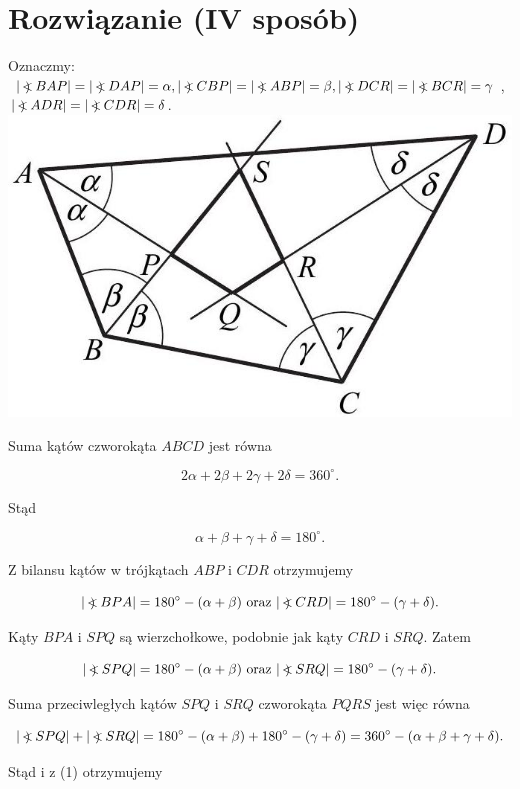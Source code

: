 \documentclass[10pt]{article}
\newcommand\Varangle{\mathop{{<\!\!\!\!\!\text{\small)}}\:}\nolimits}
\begin{document}
\section*{Rozwiązanie (IV sposób)}
Oznaczmy: $|\Varangle B A P|=|\Varangle D A P|=\alpha,|\Varangle C B P|=|\Varangle A B P|=\beta,|\Varangle D C R|=|\Varangle B C R|=\gamma$, $|\Varangle A D R|=|\Varangle C D R|=\delta$.\\
\includegraphics[max width=\textwidth, center]{2025_02_07_f5f4e8f37e6baab02e47g-10}

Suma kątów czworokąta $A B C D$ jest równa

$$
2 \alpha+2 \beta+2 \gamma+2 \delta=360^{\circ} .
$$

Stąd


\begin{equation*}
\alpha+\beta+\gamma+\delta=180^{\circ} . \tag{1}
\end{equation*}


Z bilansu kątów w trójkątach $A B P$ i $C D R$ otrzymujemy

$$
|\Varangle B P A|=180^{\circ}-(\alpha+\beta) \text { oraz }|\Varangle C R D|=180^{\circ}-(\gamma+\delta) .
$$

Kąty $B P A$ i $S P Q$ są wierzchołkowe, podobnie jak kąty $C R D$ i $S R Q$. Zatem

$$
|\Varangle S P Q|=180^{\circ}-(\alpha+\beta) \text { oraz }|\Varangle S R Q|=180^{\circ}-(\gamma+\delta) .
$$

Suma przeciwległych kątów $S P Q$ i $S R Q$ czworokąta $P Q R S$ jest więc równa

$$
|\Varangle S P Q|+|\Varangle S R Q|=180^{\circ}-(\alpha+\beta)+180^{\circ}-(\gamma+\delta)=360^{\circ}-(\alpha+\beta+\gamma+\delta) .
$$

Stąd i z (1) otrzymujemy
\end{document}
